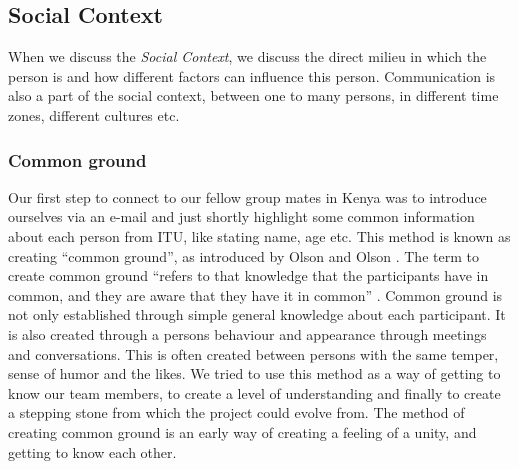 %
%
%

\subsection{Social Context} \label{subsec:socialcontext}
When we discuss the \textit{Social Context}, we discuss the direct milieu in which the person is and how different factors can influence this person. Communication is also a part of the social context, 
between one to many persons, in different time zones, different cultures etc.\\

\subsubsection{Common ground} \label{subsubsec:commonground}
Our first step to connect to our fellow group mates in Kenya was to introduce ourselves via an e-mail and just shortly highlight some common information about each person from ITU, like stating name, age etc. This method is known as creating ``common ground'', as introduced by Olson and Olson \cite{olson:2000:distance}. The term to create common ground ``refers to that knowledge that the participants have in common, and they are aware that they have it in common'' \cite{olson:2000:distance}. Common ground is not only established through simple general knowledge about each participant. It is also created through a persons behaviour and appearance through meetings and conversations. This is often created between persons with the same temper, sense of humor and the likes. We tried to use this method as a way of getting to know our team members, to create a level of understanding and finally to create a stepping stone from which the project could evolve from. The method of creating common ground is an early way of creating a feeling of a unity, and getting to know each other.

